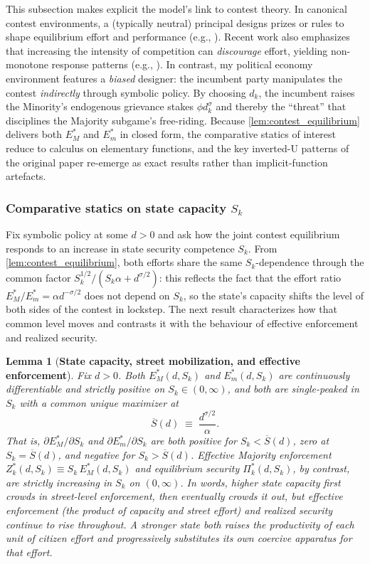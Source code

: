 \documentclass[11pt,twoside]{extarticle}
\newtheorem{lemma}{Lemma}
\begin{document}
This subsection makes explicit the model's link to contest theory. In canonical contest environments, a (typically neutral) principal designs prizes or rules to shape equilibrium effort and performance (e.g., \citet{barutSymmetricMultiplePrize1998}). Recent work also emphasizes that increasing the intensity of competition can \emph{discourage} effort, yielding non-monotone response patterns (e.g., \citet{fangTurningHeatDiscouraging2020}). In contrast, my political economy environment features a \emph{biased} designer: the incumbent party manipulates the contest \emph{indirectly} through symbolic policy. By choosing $d_k$, the incumbent raises the Minority's endogenous grievance stakes $\phi d_k^\sigma$ and thereby the ``threat'' that disciplines the Majority subgame's free-riding. Because \autoref{lem:contest_equilibrium} delivers both $E_M^*$ and $E_m^*$ in closed form, the comparative statics of interest reduce to calculus on elementary functions, and the key inverted-U patterns of the original paper re-emerge as exact results rather than implicit-function artefacts.

\subsubsection{Comparative statics on state capacity $S_k$}
Fix symbolic policy at some $d>0$ and ask how the joint contest equilibrium responds to an increase in state security competence $S_k$. From \autoref{lem:contest_equilibrium}, both efforts share the same $S_k$-dependence through the common factor $S_k^{1/2}/(S_k\alpha+d^{\sigma/2})$: this reflects the fact that the effort ratio $E_M^*/E_m^* = \alpha d^{-\sigma/2}$ does not depend on $S_k$, so the state's capacity shifts the level of both sides of the contest in lockstep. The next result characterizes how that common level moves and contrasts it with the behaviour of effective enforcement and realized security.

\begin{lemma}[\textbf{State capacity, street mobilization, and effective enforcement}] \label{lem:Sk_statics}
Fix $d>0$. Both $E_M^*(d,S_k)$ and $E_m^*(d,S_k)$ are continuously differentiable and strictly positive on $S_k\in(0,\infty)$, and both are single-peaked in $S_k$ with a common unique maximizer at
\begin{equation} \label{eq:Sk_threshold}
\overline{S}(d)\;\equiv\;\frac{d^{\sigma/2}}{\alpha}.
\end{equation}
That is, $\partial E_M^*/\partial S_k$ and $\partial E_m^*/\partial S_k$ are both positive for $S_k<\overline{S}(d)$, zero at $S_k=\overline{S}(d)$, and negative for $S_k>\overline{S}(d)$. Effective Majority enforcement $Z_k^*(d,S_k)\equiv S_k\, E_M^*(d,S_k)$ and equilibrium security $\Pi_k^*(d,S_k)$, by contrast, are strictly increasing in $S_k$ on $(0,\infty)$.
In words, higher state capacity first crowds in street-level enforcement, then eventually crowds it out, but effective enforcement (the product of capacity and street effort) and realized security continue to rise throughout. A stronger state both raises the productivity of each unit of citizen effort and progressively substitutes its own coercive apparatus for that effort.
\end{lemma}
\end{document}
